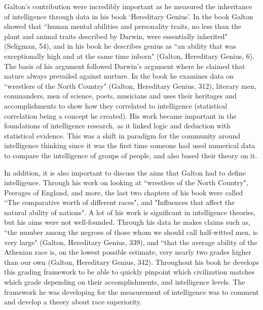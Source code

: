 \documentclass[11pt, oneside]{article}
\begin{document}
\par Galton's contribution were incredibly important as he measured the inheritance of intelligence through data in his book `Hereditary Genius'. In the book Galton showed that ``human mental abilities and personality traits, no less than the plant and animal traits described by Darwin, were essentially inherited" (Seligman, 54), and in his book he describes genius as ``an ability that was exceptionally high and at the same time inborn" (Galton, Hereditary Genius, 6). The basis of his argument followed Darwin's argument where he claimed that nature always prevailed against nurture. In the book he examines data on ``wrestlers of the North Country" (Galton, Hereditary Genius, 312), literary men, commanders, men of science, poets, musicians and uses their heritages and accomplishments to show how they correlated to intelligence (statistical correlation being a concept he created). His work became important in the foundations of intelligence research, as it linked logic and deduction with statistical evidence. This was a shift in paradigm for the community around intelligence thinking since it was the first time someone had used numerical data to compare the intelligence of groups of people, and also based their theory on it.

\par In addition, it is also important to discuss the aims that Galton had to define intelligence. Through his work on looking at ``wrestlers of the North Country", Peerages of England, and more, the last two chapters of his book were called ``The comparative worth of different races", and "Influences that affect the natural ability of nations". A lot of his work is significant in intelligence theories, but his aims were not well-founded. Through his data he makes claims such as, ``the number among the negroes of those whom we should call half-witted men, is very large" (Galton, Hereditary Genius, 339), and ``that the average ability of the Athenian race is, on the lowest possible estimate, very nearly two grades higher than our own (Galton, Hereditary Genius, 342). Throughout his book he develops this grading framework to be able to quickly pinpoint which civilization matches which grade depending on their accomplishments, and intelligence levels. The framework he was developing for the measurement of intelligence was to comment and develop a theory about race superiority.
\end{document}
